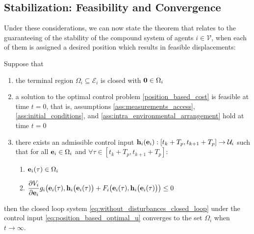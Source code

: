 \subsection{Stabilization: Feasibility and Convergence}

Under these considerations, we can now state the theorem that relates to
the guaranteeing of the stability of the compound system of agents
$i \in \mathcal{V}$, when each of them is assigned a desired
position which results in feasible displacements:\\[2.5ex]

\begin{bw_box}
\begin{theorem}

  Suppose that

  \begin{enumerate}
    \item the terminal region $\Omega_i \subseteq \mathcal{E}_i$ is
      closed with $\bm{\mathbf{0}} \in \Omega_i$
    \item a solution to the optimal control problem \eqref{position_based_cost}
      is feasible at time $t=0$, that is, assumptions
      \eqref{ass:measurements_access}, \eqref{ass:initial_conditions}, and
      \eqref{ass:intra_environmental_arrangement} hold at time $t=0$
    \item there exists an admissible control input
      $\bm{\mathbf{h}}_i(\bm{\mathbf{e}}_i) : [t_k + T_p, t_{k+1} + T_p] \to \mathcal{U}_i$
      such that for all $\bm{\mathbf{e}}_i \in \Omega_i$ and
      $\forall \tau \in [t_k + T_p, t_{k+1} + T_p]$:

      \begin{enumerate}
        \item $\bm{\mathbf{e}}_i(\tau) \in \Omega_i$
        \item $\dfrac{\partial V_i}{\partial \bm{\mathbf{e}}_i} g_i\big(\bm{\mathbf{e}}_i(\tau),
        \bm{\mathbf{h}}_i\big(\bm{\mathbf{e}}_i(\tau)\big)
          + F_i\big(\bm{\mathbf{e}}_i(\tau), \bm{\mathbf{h}}_i\big(\bm{\mathbf{e}}_i(\tau)\big)\big) \leq 0$
      \end{enumerate}

  \end{enumerate}

  then the closed loop system \eqref{eq:without_disturbances_closed_loop} under
  the control input \eqref{eq:position_based_optimal_u} converges to the set
  $\Omega_i$ when $t \to \infty$.

\end{theorem}
\end{bw_box}

